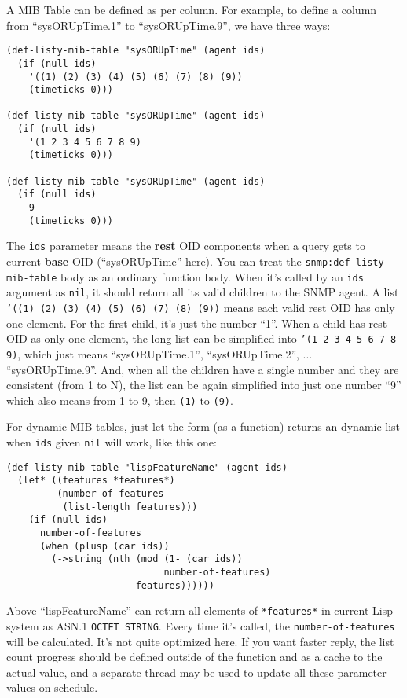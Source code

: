 \documentclass[reprint,9pt]{sigplanconf}
\begin{document}
A MIB Table can be defined as per column. For example, to define a
column from ``sysORUpTime.1'' to ``sysORUpTime.9'', we have three
ways:
%
\begin{verbatim}
(def-listy-mib-table "sysORUpTime" (agent ids)
  (if (null ids)
    '((1) (2) (3) (4) (5) (6) (7) (8) (9))
    (timeticks 0)))

(def-listy-mib-table "sysORUpTime" (agent ids)
  (if (null ids)
    '(1 2 3 4 5 6 7 8 9)
    (timeticks 0)))

(def-listy-mib-table "sysORUpTime" (agent ids)
  (if (null ids)
    9
    (timeticks 0)))
\end{verbatim}

The \texttt{ids} parameter means the \textbf{rest} OID components
when a query gets to current \textbf{base} OID (``sysORUpTime'' here).
You can treat the \texttt{snmp:def-listy-mib-table} body as an ordinary
function body. When
it's called by an \texttt{ids} argument as \texttt{nil}, it should
return all its valid children to the SNMP agent. A list \texttt{'((1)
  (2) (3) (4) (5) (6) (7) (8) (9))} means each valid rest OID
has only one element. For the first child, it's just the number
``1''. When a child has rest OID as only one element, the
long list can be simplified into \texttt{'(1 2 3 4 5 6 7 8 9)}, which
just means ``sysORUpTime.1'', ``sysORUpTime.2'',
... ``sysORUpTime.9''. And, when all the children have a single number
and they are consistent (from 1 to N), the list can be again simplified
into just one number ``9'' which also means from 1 to 9, then
\texttt{(1)} to \texttt{(9)}.

For dynamic MIB tables, just let the form (as a function) returns an
dynamic list when \texttt{ids} given \texttt{nil} will work, like this
one:
%
\begin{verbatim}
(def-listy-mib-table "lispFeatureName" (agent ids)
  (let* ((features *features*)
         (number-of-features
          (list-length features)))
    (if (null ids)
      number-of-features
      (when (plusp (car ids))
        (->string (nth (mod (1- (car ids))
                            number-of-features)
                       features))))))
\end{verbatim}

Above ``lispFeatureName'' can return all elements of
\texttt{*features*} in current Lisp system as ASN.1 \texttt{OCTET
  STRING}. Every time it's called, the \texttt{number-of-features}
will be calculated. It's not 	quite optimized here. If you want faster
reply, the list count progress should be defined outside of the
function and as a cache to the actual value, and a separate thread may
be used to update all these parameter values on schedule.
\end{document}
